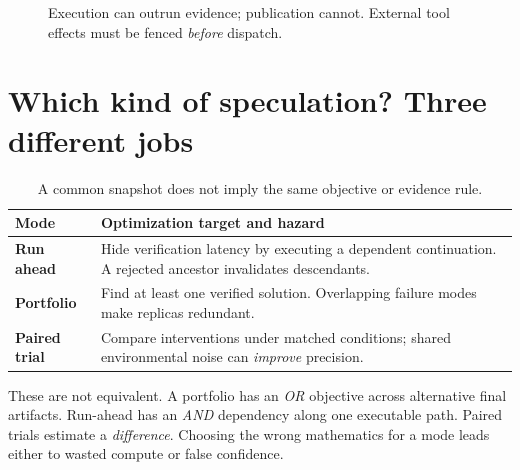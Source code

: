 \documentclass[10pt,twocolumn]{article}
\begin{document}
\begin{figure}[t]
\centering
{}
\caption{Execution can outrun evidence; publication cannot. External tool effects must be fenced \emph{before} dispatch.}
\end{figure}

\section{Which kind of speculation? Three different jobs}

\begin{table}[t]\centering\footnotesize
\begin{tabularx}{\columnwidth}{@{}p{}X@{}}\toprule
Mode & Optimization target and hazard\\\midrule
\textbf{Run ahead} & Hide verification latency by executing a dependent continuation. A rejected ancestor invalidates descendants.\\
\textbf{Portfolio} & Find at least one verified solution. Overlapping failure modes make replicas redundant.\\
\textbf{Paired trial} & Compare interventions under matched conditions; shared environmental noise can \emph{improve} precision.\\\bottomrule
\end{tabularx}\caption{A common snapshot does not imply the same objective or evidence rule.}
\end{table}

These are not equivalent. A portfolio has an \emph{OR} objective across alternative final artifacts. Run-ahead has an \emph{AND} dependency along one executable path. Paired trials estimate a \emph{difference}. Choosing the wrong mathematics for a mode leads either to wasted compute or false confidence.
\end{document}
